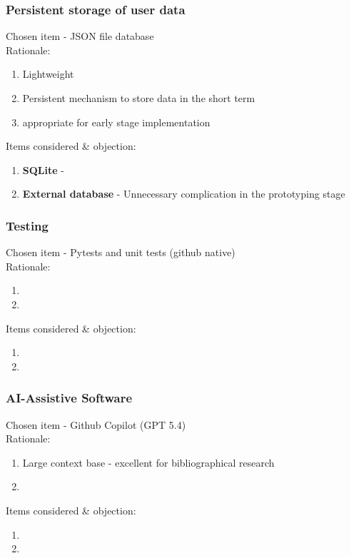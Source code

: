 \documentclass{article}
\begin{document}
\subsubsection{Persistent storage of user data}
Chosen item - JSON file database \\
\large{Rationale:} \\
\begin{enumerate}
    \item Lightweight
    \item Persistent mechanism to store data in the short term
    \item appropriate for early stage implementation
\end{enumerate}
\large{Items considered \& objection:} \\
\begin{enumerate}
    \item \textbf{SQLite} - 
    \item \textbf{External database} - Unnecessary complication in the prototyping stage
\end{enumerate}

\subsubsection{Testing}
Chosen item - Pytests and unit tests (github native) \\
\large{Rationale:} \\
\begin{enumerate}
    \item 
    \item
\end{enumerate}
\large{Items considered \& objection:} \\
\begin{enumerate}
    \item 
    \item
\end{enumerate}

\subsubsection{AI-Assistive Software}
Chosen item - Github Copilot (GPT 5.4)  \\
\large{Rationale:} \\
\begin{enumerate}
    \item Large context base - excellent for bibliographical research
    \item
\end{enumerate}
\large{Items considered \& objection:} \\
\begin{enumerate}
    \item 
    \item
\end{enumerate}
\end{document}
